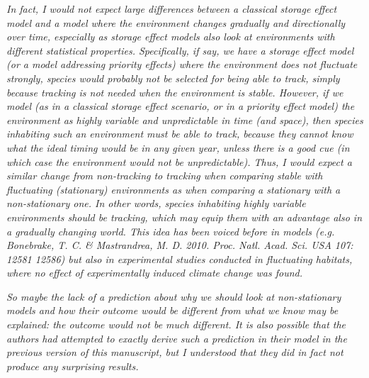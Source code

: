 \documentclass[11pt]{article}
\begin{document}
\emph{In fact, I would not expect large differences between a classical storage effect model and a
model where the environment changes gradually and directionally over time, especially as
storage effect models also look at environments with different statistical properties.
Specifically, if say, we have a storage effect model (or a model addressing priority effects)
where the environment does not fluctuate strongly, species would probably not be selected for
being able to track, simply because tracking is not needed when the environment is stable.
However, if we model (as in a classical storage effect scenario, or in a priority effect
model) the environment as highly variable and unpredictable in time (and space), then species
inhabiting such an environment must be able to track, because they cannot know what the ideal
timing would be in any given year, unless there is a good cue (in which case the environment
would not be unpredictable). Thus, I would expect a similar change from non-tracking to
tracking when comparing stable with fluctuating (stationary) environments as when comparing a
stationary with a non-stationary one. In other words, species inhabiting highly variable
environments should be tracking, which may equip them with an advantage also in a gradually
changing world. This idea has been voiced before in models (e.g. Bonebrake, T. C. \&
Mastrandrea, M. D. 2010. Proc. Natl. Acad. Sci. USA 107: 12581 12586) but also in
experimental studies conducted in fluctuating habitats, where no effect of experimentally
induced climate change was found.}

\emph{So maybe the lack of a prediction about why we should look at non-stationary models and how
their outcome would be different from what we know may be explained: the outcome would not be
much different. It is also possible that the authors had attempted to exactly derive such a
prediction in their model in the previous version of this manuscript, but I understood that
they did in fact not produce any surprising results.}\\
\end{document}
